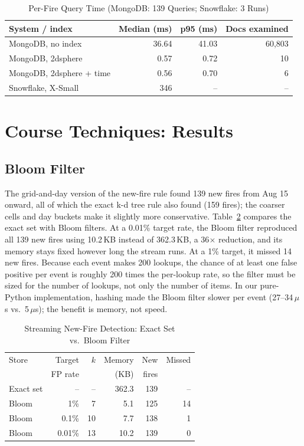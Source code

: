 \documentclass[10pt,journal,compsoc]{IEEEtran}
\begin{document}
\begin{table}[!t]
\caption{Per-Fire Query Time (MongoDB: 139 Queries; Snowflake: 3 Runs)}
\label{tab:mongo}
\centering
\footnotesize
\setlength{\tabcolsep}{3pt}
\begin{tabular}{@{}lrrr@{}}
\toprule
System / index & Median (ms) & p95 (ms) & Docs examined \\
\midrule
MongoDB, no index & 36.64 & 41.03 & 60,803 \\
MongoDB, 2dsphere & 0.57 & 0.72 & 10 \\
MongoDB, 2dsphere + time & 0.56 & 0.70 & 6 \\
Snowflake, X-Small & 346 & -- & -- \\
\bottomrule
\end{tabular}
\end{table}

\section{Course Techniques: Results}\label{sec:course}

\subsection{Bloom Filter}
The grid-and-day version of the new-fire rule found 139 new fires from Aug 15 onward, all of which the exact k-d tree rule also found (159 fires); the coarser cells and day buckets make it slightly more conservative. Table~\ref{tab:bloom} compares the exact set with Bloom filters. At a 0.01\% target rate, the Bloom filter reproduced all 139 new fires using 10.2\,KB instead of 362.3\,KB, a 36$\times$ reduction, and its memory stays fixed however long the stream runs. At a 1\% target, it missed 14 new fires. Because each event makes 200 lookups, the chance of at least one false positive per event is roughly 200 times the per-lookup rate, so the filter must be sized for the number of lookups, not only the number of items. In our pure-Python implementation, hashing made the Bloom filter slower per event (27--34\,$\mu$s vs.\ 5\,$\mu$s); the benefit is memory, not speed.

\begin{table}[!t]
\caption{Streaming New-Fire Detection: Exact Set vs.\ Bloom Filter}
\label{tab:bloom}
\centering
\small
\setlength{\tabcolsep}{3.5pt}
\begin{tabular}{@{}lrrrrr@{}}
\toprule
Store & Target & $k$ & Memory & New & Missed \\
 & FP rate & & (KB) & fires & \\
\midrule
Exact set & -- & -- & 362.3 & 139 & -- \\
Bloom & 1\% & 7 & 5.1 & 125 & 14 \\
Bloom & 0.1\% & 10 & 7.7 & 138 & 1 \\
Bloom & 0.01\% & 13 & 10.2 & 139 & 0 \\
\bottomrule
\end{tabular}
\end{table}
\end{document}
